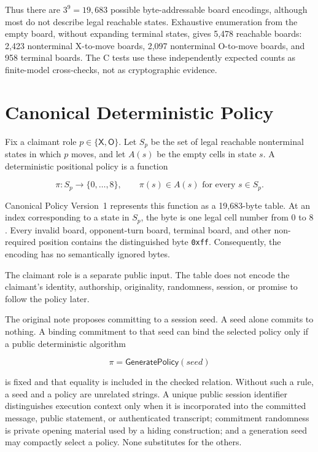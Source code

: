 Thus there are $3^9=19{,}683$ possible byte-addressable board encodings,
although most do not describe legal reachable states. Exhaustive enumeration
from the empty board, without expanding terminal states, gives 5,478 reachable
boards: 2,423 nonterminal X-to-move boards, 2,097 nonterminal O-to-move boards,
and 958 terminal boards. The C tests use these independently expected counts
as finite-model cross-checks, not as cryptographic evidence.

\section{Canonical Deterministic Policy}
\label{sec:ttt-policy}
\label{def:ttt-policy-v1}

Fix a claimant role $p\in\{\mathsf{X},\mathsf{O}\}$. Let $S_p$ be the set
of legal reachable nonterminal states in which $p$ moves, and let $A(s)$
be the empty cells in state $s$. A deterministic positional policy is a
function

\[
    \pi:S_p\longrightarrow\{0,\ldots,8\},
    \qquad \pi(s)\in A(s)\text{ for every }s\in S_p.
\]

Canonical Policy Version~1 represents this function as a 19,683-byte table.
At an index corresponding to a state in $S_p$, the byte is one legal cell
number from $0$ to $8$. Every invalid board, opponent-turn board, terminal
board, and other non-required position contains the distinguished byte
\texttt{0xff}. Consequently, the encoding has no semantically ignored bytes.

The claimant role is a separate public input. The table does not encode the
claimant's identity, authorship, originality, randomness, session, or promise
to follow the policy later.

The original note proposes committing to a session seed. A seed alone commits
to nothing. A binding commitment to that seed can bind the selected policy
only if a public deterministic algorithm

\[
    \pi=\mathsf{GeneratePolicy}(\mathit{seed})
\]

is fixed and that equality is included in the checked relation. Without such
a rule, a seed and a policy are unrelated strings. A unique public session
identifier distinguishes execution context only when it is incorporated into
the committed message, public statement, or authenticated transcript;
commitment randomness is private opening material used by a hiding
construction; and a generation seed may compactly select a policy. None
substitutes for the others.

